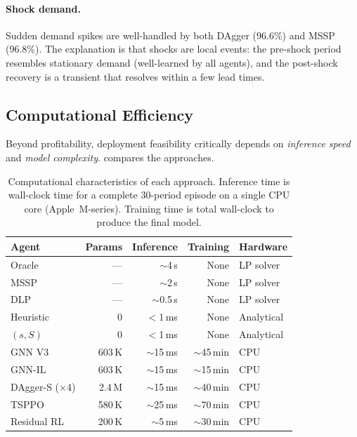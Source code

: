 \paragraph{Shock demand.}
Sudden demand spikes are well-handled by both DAgger (96.6\%) and
MSSP (96.8\%). The explanation is that shocks are local events:
the pre-shock period resembles stationary demand (well-learned by
all agents), and the post-shock recovery is a transient that
resolves within a few lead times.

\subsection{Computational Efficiency}\label{sec:speed}

Beyond profitability, deployment feasibility critically depends on
\emph{inference speed} and \emph{model complexity}. 
compares the approaches.

\begin{table}[htbp]
\centering
\caption{Computational characteristics of each approach. Inference time
is wall-clock time for a complete 30-period episode on a single CPU core
(Apple~M-series). Training time is total wall-clock to produce the
final model.}
\label{tab:speed}
\small
\begin{tabular}{lrrrl}
\toprule
\textbf{Agent} & \textbf{Params} & \textbf{Inference} & \textbf{Training}
               & \textbf{Hardware} \\
\midrule
Oracle        & --- & $\sim$4\,s & None & LP solver \\
MSSP          & --- & $\sim$2\,s & None & LP solver \\
DLP           & --- & $\sim$0.5\,s & None & LP solver \\
Heuristic     & 0   & $<$1\,ms & None & Analytical \\
$(s,S)$       & 0   & $<$1\,ms & None & Analytical \\
\midrule
GNN V3        & 603\,K & $\sim$15\,ms & $\sim$45\,min & CPU \\
GNN-IL        & 603\,K & $\sim$15\,ms & $\sim$15\,min & CPU \\
DAgger-S (×4) & 2.4\,M & $\sim$15\,ms & $\sim$40\,min & CPU \\
TSPPO         & 580\,K & $\sim$25\,ms & $\sim$70\,min & CPU \\
Residual RL   & 200\,K & $\sim$5\,ms  & $\sim$30\,min & CPU \\
\bottomrule
\end{tabular}
\end{table}

